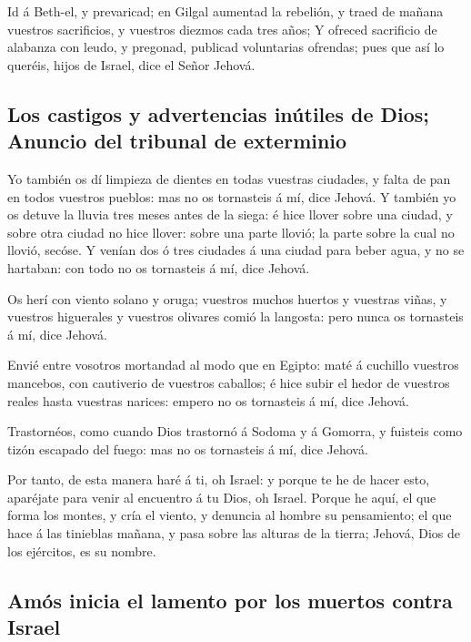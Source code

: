  Id á Beth-el, y prevaricad; en Gilgal aumentad la
rebelión, y traed de mañana vuestros sacrificios, y vuestros diezmos
cada tres años;  Y ofreced sacrificio de alabanza con
leudo, y pregonad, publicad voluntarias ofrendas; pues que así lo
queréis, hijos de Israel, dice el Señor Jehová.

\hypertarget{los-castigos-y-advertencias-inuxfatiles-de-dios-anuncio-del-tribunal-de-exterminio}{%
\subsection{Los castigos y advertencias inútiles de Dios; Anuncio del
tribunal de
exterminio}\label{los-castigos-y-advertencias-inuxfatiles-de-dios-anuncio-del-tribunal-de-exterminio}}

 Yo también os dí limpieza de dientes en todas vuestras
ciudades, y falta de pan en todos vuestros pueblos: mas no os tornasteis
á mí, dice Jehová.  Y también yo os detuve la lluvia tres
meses antes de la siega: é hice llover sobre una ciudad, y sobre otra
ciudad no hice llover: sobre una parte llovió; la parte sobre la cual no
llovió, secóse.  Y venían dos ó tres ciudades á una ciudad
para beber agua, y no se hartaban: con todo no os tornasteis á mí, dice
Jehová.

 Os herí con viento solano y oruga; vuestros muchos
huertos y vuestras viñas, y vuestros higuerales y vuestros olivares
comió la langosta: pero nunca os tornasteis á mí, dice Jehová.

 Envié entre vosotros mortandad al modo que en Egipto:
maté á cuchillo vuestros mancebos, con cautiverio de vuestros caballos;
é hice subir el hedor de vuestros reales hasta vuestras narices: empero
no os tornasteis á mí, dice Jehová.

 Trastornéos, como cuando Dios trastornó á Sodoma y á
Gomorra, y fuisteis como tizón escapado del fuego: mas no os tornasteis
á mí, dice Jehová.

 Por tanto, de esta manera haré á ti, oh Israel: y porque
te he de hacer esto, aparéjate para venir al encuentro á tu Dios, oh
Israel.  Porque he aquí, el que forma los montes, y cría
el viento, y denuncia al hombre su pensamiento; el que hace á las
tinieblas mañana, y pasa sobre las alturas de la tierra; Jehová, Dios de
los ejércitos, es su nombre.

\hypertarget{amuxf3s-inicia-el-lamento-por-los-muertos-contra-israel}{%
\subsection{Amós inicia el lamento por los muertos contra
Israel}\label{amuxf3s-inicia-el-lamento-por-los-muertos-contra-israel}}

